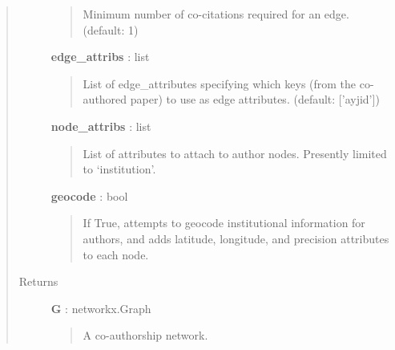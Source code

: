 \documentclass[letterpaper,10pt,english]{sphinxmanual}
\begin{document}
\begin{fulllineitems}
\begin{quote}
\begin{description}
\begin{quote}
Minimum number of co-citations required for an edge. (default: 1)
\end{quote}

\textbf{edge\_attribs} : list
\begin{quote}

List of edge\_attributes specifying which {\hyperref[tethne.classes.paper:tethne.classes.paper.Paper]{}} keys (from the
co-authored paper) to use as edge attributes. (default: {[}'ayjid'{]})
\end{quote}

\textbf{node\_attribs} : list
\begin{quote}

List of attributes to attach to author nodes. Presently limited to
`institution'.
\end{quote}

\textbf{geocode} : bool
\begin{quote}

If True, attempts to geocode institutional information for authors, and
adds latitude, longitude, and precision attributes to each node.
\end{quote}

\item[{Returns}] \leavevmode
\textbf{G} : networkx.Graph
\begin{quote}

A co-authorship network.
\end{quote}

\end{description}\end{quote}

\end{fulllineitems}

\end{document}
